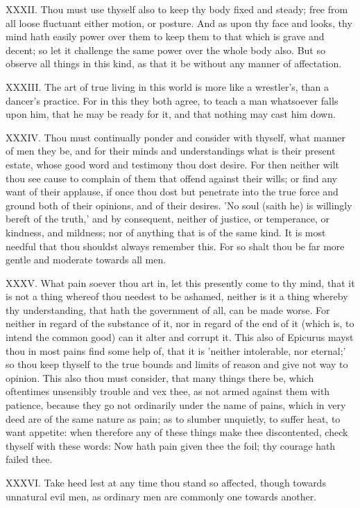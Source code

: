 XXXII. Thou must use thyself also to keep thy body fixed and steady;
free from all loose fluctuant either motion, or posture. And as upon thy
face and looks, thy mind hath easily power over them to keep them to that
which is grave and decent; so let it challenge the same power over the
whole body also. But so observe all things in this kind, as that it be
without any manner of affectation.

XXXIII. The art of true living in this world is more like a wrestler's,
than a dancer's practice. For in this they both agree, to teach a man
whatsoever falls upon him, that he may be ready for it, and that nothing
may cast him down.

XXXIV. Thou must continually ponder and consider with thyself, what
manner of men they be, and for their minds and understandings what is
their present estate, whose good word and testimony thou dost desire. For
then neither wilt thou see cause to complain of them that offend against
their wills; or find any want of their applause, if once thou dost but
penetrate into the true force and ground both of their opinions, and of
their desires. 'No soul (saith he) is willingly bereft of the truth,' and
by consequent, neither of justice, or temperance, or kindness, and
mildness; nor of anything that is of the same kind. It is most needful
that thou shouldst always remember this. For so shalt thou be far more
gentle and moderate towards all men.

XXXV. What pain soever thou art in, let this presently come to thy mind,
that it is not a thing whereof thou needest to be ashamed, neither is it a
thing whereby thy understanding, that hath the government of all, can be
made worse. For neither in regard of the substance of it, nor in regard of
the end of it (which is, to intend the common good) can it alter and
corrupt it. This also of Epicurus mayst thou in most pains find some help
of, that it is 'neither intolerable, nor eternal;' so thou keep thyself to
the true bounds and limits of reason and give not way to opinion. This
also thou must consider, that many things there be, which oftentimes
unsensibly trouble and vex thee, as not armed against them with patience,
because they go not ordinarily under the name of pains, which in very deed
are of the same nature as pain; as to slumber unquietly, to suffer heat,
to want appetite: when therefore any of these things make thee
discontented, check thyself with these words: Now hath pain given thee the
foil; thy courage hath failed thee.

XXXVI. Take heed lest at any time thou stand so affected, though towards
unnatural evil men, as ordinary men are commonly one towards another.

